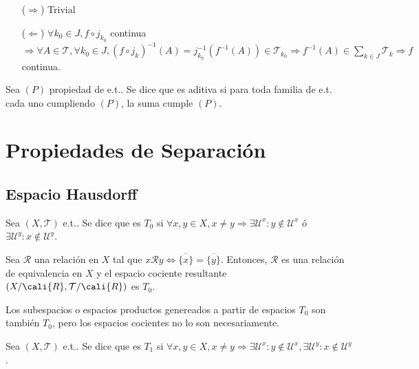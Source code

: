 \begin{dem}
  \begin{enumerate}[label=(\roman*)]
    \item [($\Rightarrow$)] Trivial
    \item [($\Leftarrow$)] $\forall k_{0} \in J, f \circ j_{k_{0}}$ continua $\Rightarrow \forall A \in \mathcal{T}, \forall k_{0} \in J, (f \circ j_{k})^{-1}(A) = j_{k_{0}}^{-1}(f^{-1}(A)) \in \mathcal{T}_{k_{0}} \Rightarrow f^{-1}(A) \in \sum_{ k \in J } \mathcal{T}_{k} \Rightarrow f$ continua.
  \end{enumerate}
\end{dem}

\begin{defn}
  Sea $(P)$ propiedad de e.t.. Se dice que es aditiva si para toda familia de e.t. cada uno cumpliendo $(P)$, la suma cumple $(P)$.
\end{defn}

\chapter{Propiedades de Separación}

\section{Espacio Hausdorff}

\begin{defn}[$T_0$]
  Sea $( X, \mathcal{T} )$ e.t.. Se dice que es $T_{0}$ si $\forall x, y \in X, x \neq y \Rightarrow \exists \mathcal{U}^{x} : y \not \in \mathcal{U}^{x} $ ó $ \exists \mathcal{U}^{y} : x \not \in \mathcal{U}^{y}$.
\end{defn}

\begin{ejm}
  Sea $\mathcal{R}$ una relación en $X$ tal que $x \mathcal{R} y \Leftrightarrow \overline{\{ x \}} = \overline{\{ y \}}$. Entonces, $\mathcal{R}$ es una relación de equivalencia en $X$ y el espacio cociente resultante $( X/\cali{R}, \mathcal{T}/\cali{R} )$ es $T_{0}$.
\end{ejm}

\begin{obs}
  Los subespacios o espacios productos genereados a partir de espacios $T_{0}$ son también $T_{0}$, pero los espacios cocientes no lo son necesariamente.
\end{obs}

\begin{defn}[$T_1$]
  Sea $( X, \mathcal{T} )$ e.t.. Se dice que es $T_{1}$ si $ \forall x, y \in X, x \neq y \Rightarrow \exists \mathcal{U}^{x}: y \not \in \mathcal{U}^{x}, \exists \mathcal{U}^{y}: x \not \in \mathcal{U}^{y}$.
\end{defn}

